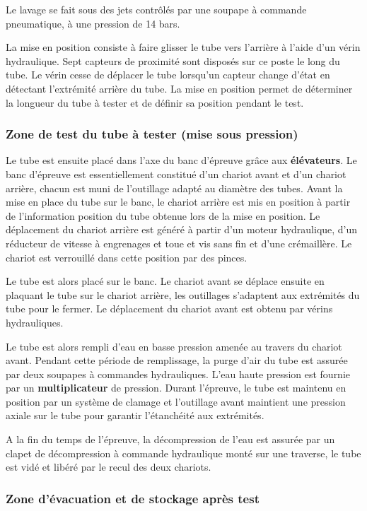 Le lavage se fait sous des jets contrôlés par une soupape à commande pneumatique, à une pression de 14 bars.

La mise en position consiste à faire glisser le tube vers l'arrière à l'aide d'un vérin hydraulique. Sept capteurs de proximité sont disposés sur ce poste le long du tube. Le vérin cesse de déplacer le tube lorsqu'un capteur change d'état en détectant l'extrémité arrière du tube. La mise en position permet de
déterminer la longueur du tube à tester et de définir sa position pendant le test.

\subsubsection{Zone de test du tube à tester (mise sous pression)}

Le tube est ensuite placé dans l'axe du banc d'épreuve grâce aux \textbf{élévateurs}. Le banc d'épreuve est essentiellement constitué d'un chariot avant et d'un chariot arrière, chacun est muni de l'outillage adapté au diamètre des tubes. Avant la mise en place du tube sur le banc, le chariot arrière est mis en position à partir de l'information \og position du tube \fg obtenue lors de la mise en position. Le déplacement du chariot arrière est généré à partir d'un moteur hydraulique, d'un réducteur de vitesse à engrenages et toue et vis sans fin et d'une crémaillère. Le chariot est verrouillé dans cette position par des pinces.

Le tube est alors placé sur le banc. Le chariot avant se déplace ensuite en plaquant le tube sur le chariot arrière, les outillages s'adaptent aux extrémités du tube pour le fermer. Le déplacement du chariot avant est obtenu par vérins hydrauliques.

Le tube est alors rempli d'eau en basse pression amenée au travers du chariot avant. Pendant cette période de remplissage, la purge d'air du tube est assurée par deux soupapes à commandes hydrauliques. L'eau haute pression est fournie par un \textbf{multiplicateur} de pression. Durant l'épreuve, le tube est maintenu en position par un système de clamage et l'outillage avant maintient une pression axiale sur le tube pour garantir l'étanchéité aux extrémités.

A la fin du temps de l'épreuve, la décompression de l'eau est assurée par un clapet de décompression à commande hydraulique monté sur une traverse, le tube est vidé et libéré par le recul des deux chariots.

\subsubsection{Zone d'évacuation et de stockage après test}

